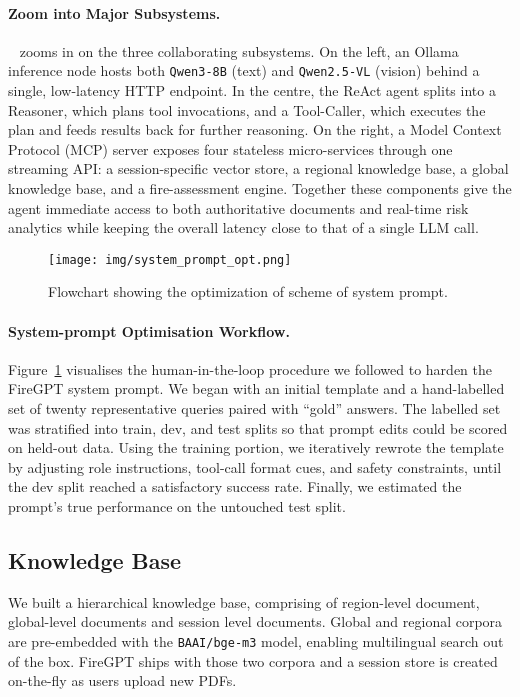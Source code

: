 \documentclass[lang=english,inputenc=utf8,fontsize=10pt]{ldvarticle}
\begin{document}
\paragraph{Zoom into Major Subsystems.}
~ zooms in on the three collaborating
subsystems.  
On the left, an Ollama inference node hosts both
\texttt{Qwen3-8B} (text) and \texttt{Qwen2.5-VL} (vision) behind a single,
low-latency HTTP endpoint.  
In the centre, the ReAct agent splits into a Reasoner,
which plans tool invocations, and a Tool-Caller, which executes the
plan and feeds results back for further reasoning.  
On the right, a Model Context Protocol (MCP) server exposes four
stateless micro-services through one streaming API: a session-specific
vector store, a regional knowledge base, a global knowledge base, and a fire-assessment engine.  
Together these components give the agent immediate access to both
authoritative documents and real-time risk analytics while keeping the
overall latency close to that of a single LLM call.


\begin{figure}[t]
  \centering
  \texttt{[image: img/system\_prompt\_opt.png]}
  \caption{Flowchart showing the optimization of scheme of system prompt.}
  \label{fig:system-prompt-opt}
\end{figure}

\paragraph{System-prompt Optimisation Workflow.}
Figure~\ref{fig:system-prompt-opt} visualises the human-in-the-loop
procedure we followed to harden the FireGPT system prompt.  We began with
an initial template and a hand-labelled set of twenty representative
queries paired with “gold” answers.
The labelled set was stratified into train, dev, and
test splits so that prompt edits could be scored on held-out data.
Using the training portion, we iteratively rewrote the template by adjusting
role instructions, tool-call format cues, and safety constraints, until the
dev split reached a satisfactory success rate.  Finally, we estimated the prompt’s
true performance on the untouched test split.



\subsection*{Knowledge Base}
We built a hierarchical knowledge base, comprising of region-level document,
global-level documents and session level documents. Global and regional corpora are pre-embedded with the
\texttt{BAAI/bge-m3} model, enabling multilingual search out of the box.
FireGPT ships with those two corpora and a session store is created
on-the-fly as users upload new PDFs.
\end{document}
